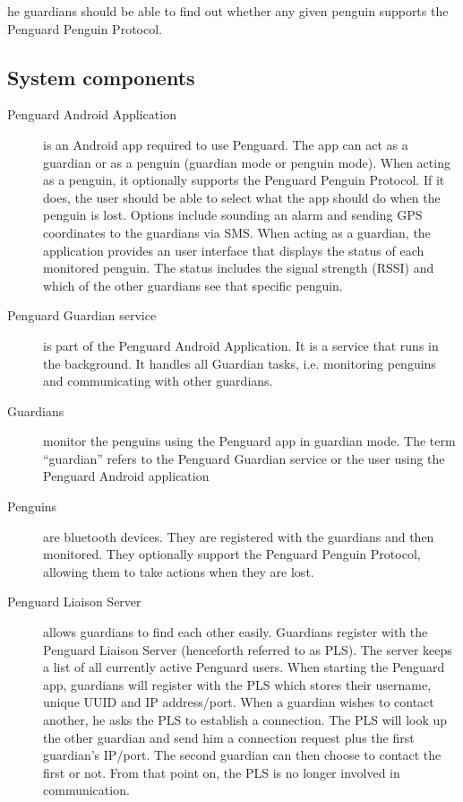 \documentclass{report}
\begin{document}
he guardians should be able to find out whether any given penguin supports the Penguard Penguin Protocol.

\subsection{System components}

\begin{description}
    \item [Penguard Android Application] is an Android app required to use Penguard. The app can act as a guardian or as a penguin (guardian mode or penguin mode). When acting as a penguin, it optionally supports the Penguard Penguin Protocol. If it does, the user should be able to select what the app should do when the penguin is lost. Options include sounding an alarm and sending GPS coordinates to the guardians via SMS. When acting as a guardian, the application provides an user interface that displays the status of each monitored penguin. The status includes the signal strength (RSSI) and which of the other guardians see that specific penguin.
    \item [Penguard Guardian service] is part of the Penguard Android Application. It is a service that runs in the background. It handles all Guardian tasks, i.e. monitoring penguins and communicating with other guardians.
    \item [Guardians] monitor the penguins using the Penguard app in guardian mode. The term ``guardian'' refers to the Penguard Guardian service or the user using the Penguard Android application
    \item [Penguins] are bluetooth devices. They are registered with the guardians and then monitored. They optionally support the Penguard Penguin Protocol, allowing them to take actions when they are lost.
    \item [Penguard Liaison Server] allows guardians to find each other easily. Guardians register with the Penguard Liaison Server (henceforth referred to as PLS). The server keeps a list of all currently active Penguard users. When starting the Penguard app, guardians will register with the PLS which stores their username, unique UUID and IP address/port. When a guardian wishes to contact another, he asks the PLS to establish a connection. The PLS will look up the other guardian and send him a connection request plus the first guardian's IP/port. The second guardian can then choose to contact the first or not. From that point on, the PLS is no longer involved in communication.
\end{description}
\end{document}
